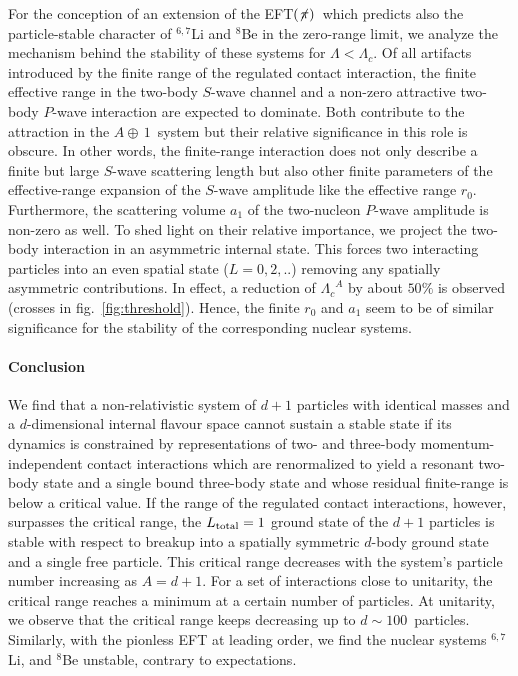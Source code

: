 \documentclass[aps,prl,onecolumn,groupedaddress,superscriptaddress]
{revtex4}
\newcommand{\lc}{\ensuremath{\Lambda_c}}
\newcommand{\abb}{\mbox{\ensuremath{A\oplus\,1}}}
\newcommand{\eftnopi}{\mbox{EFT$(\not \! \pi)$}}
\newcommand{\figref}[1]{fig.~\ref{#1}}
\begin{document}
For the conception of an extension of the \eftnopi~which predicts also the
particle-stable character of $^{6,7}$Li and $^8$Be in the zero-range limit,
we analyze the mechanism behind the stability of these systems for $\Lambda<\lc$.
Of all artifacts introduced by the finite range of the regulated contact interaction,
the finite effective range in the two-body $S$-wave channel
and a non-zero attractive two-body $P$-wave interaction are expected to dominate. 
Both contribute to the attraction in the \abb~system but their relative significance
in this role is obscure.
In other words, the finite-range interaction does not only describe a finite
but large $S$-wave scattering length but also other finite parameters of the
effective-range expansion of the $S$-wave amplitude like the effective range $r_0$. 
Furthermore, the scattering volume $a_1$ of the two-nucleon $P$-wave amplitude is non-zero as well.
To shed light on their
relative importance, we project the two-body interaction in an asymmetric internal state.
This forces two interacting particles into an even spatial state ($L=0,2,..$) 
removing any spatially asymmetric contributions. 
In effect, a reduction of $\lc^A$ by about $50\%$ is observed 
(crosses in \figref{fig:threshold}).
Hence, the finite $r_0$ and $a_1$ seem to be of similar significance for the stability
of the corresponding nuclear systems.




\vspace{4mm}
\paragraph*{Conclusion}
We find that a non-relativistic system
of $d+1$ particles with identical masses and a $d$-dimensional internal
flavour space cannot sustain a stable state if its dynamics is constrained
by representations of two- and three-body momentum-independent contact
interactions which are renormalized to yield a resonant two-body state
and a single bound three-body state and whose residual finite-range is
below a critical value. 
If the range of the regulated contact interactions, however,
surpasses the critical range, the $L_{\text{\scriptsize total}} = 1$
ground state of the $d+1$ particles is stable with respect to breakup
into a spatially symmetric $d$-body ground state and a single free particle.
This critical range decreases with the system's particle number increasing as $A=d+1$.
For a set of interactions close to unitarity, the critical range
reaches a minimum at a certain number of particles.
At unitarity, we observe that the critical range keeps decreasing up to $d\sim100$~particles.
Similarly, with the pionless EFT at leading order, we find the nuclear systems ${}^{6,7}$Li, and $^8$Be unstable, contrary to expectations. 
\end{document}
